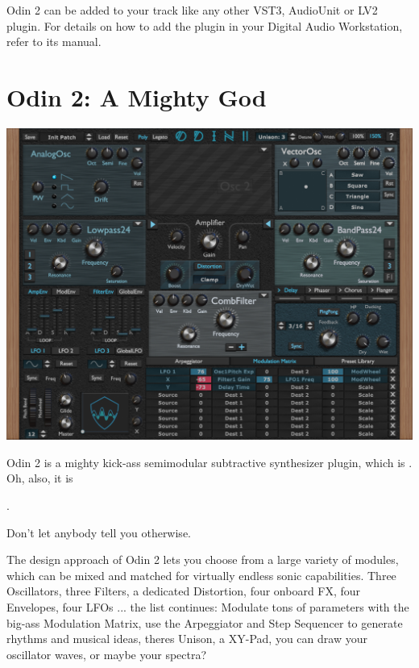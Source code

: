 \vspace{5mm}
Odin 2 can be added to your track like any other VST3, AudioUnit or LV2 plugin. For details on how to add the plugin in your Digital Audio Workstation, refer to its manual.

\clearpage
\section{Odin 2: A Mighty God}
\begin{center}
    \includegraphics[width=\textwidth]{graphics/mighty_god.png}
\end{center}

Odin 2 is a mighty kick-ass semimodular subtractive synthesizer plugin, which is . Oh, also, it is

\begin{center}
    .
\end{center}

Don't let anybody tell you otherwise. 

\vspace{1mm}
The design approach of Odin 2 lets you choose from a large variety of modules, which can be mixed and matched for virtually endless sonic capabilities. Three Oscillators, three Filters, a dedicated Distortion, four onboard FX, four Envelopes, four LFOs ... the list continues: Modulate tons of parameters with the big-ass Modulation Matrix, use the Arpeggiator and Step Sequencer to generate rhythms and musical ideas, theres Unison, a XY-Pad, you can draw your oscillator waves, or maybe your spectra?

